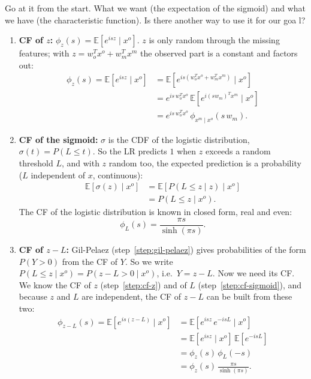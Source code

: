 \documentclass[10pt]{article}
\newcommand{\E}{\mathbb{E}}
\newcommand{\xo}{x^o}
\newcommand{\xm}{x^m}
\begin{document}
Go at it from the start. What we want (the expectation of the sigmoid) and what we have (the characteristic function). Is there another way to use it for our goa l?

\begin{enumerate}[label=\textbf{\arabic*.}, ref=\arabic*, itemsep=6pt]

\item \label{step:cf-z} \textbf{CF of $z$:} $\phi_z(s) = \E[e^{isz} \mid \xo]$. $z$ is only random through the missing features; with $z = w_o^T \xo + w_m^T \xm$ the observed part is a constant and factors out:
\begin{align*}
  \phi_z(s) = \E[e^{isz} \mid \xo] &= \E[e^{is(w_o^T \xo + w_m^T \xm)} \mid \xo] \\
  &= e^{is\, w_o^T \xo}\, \E[e^{i (s w_m)^T \xm} \mid \xo] \\
  &= e^{is\, w_o^T \xo}\, \phi_{\xm \mid \xo}(s\, w_m).
\end{align*}

\item \label{step:cf-sigmoid} \textbf{CF of the sigmoid:} $\sigma$ is the CDF of the logistic distribution, $\sigma(t) = P(L \leq t)$. So the LR predicts $1$ when $z$ exceeds a random threshold $L$, and with $z$ random too, the expected prediction is a probability ($L$ independent of $x$, continuous):
\begin{align*}
  \E[\sigma(z) \mid \xo] &= \E[P(L \leq z \mid z) \mid \xo] \\
  &= P(L \leq z \mid \xo).
\end{align*}
The CF of the logistic distribution is known in closed form, real and even:
\[
  \phi_L(s) = \frac{\pi s}{\sinh(\pi s)}.
\]

\item \label{step:cf-difference} \textbf{CF of $z - L$:} Gil-Pelaez (step~\ref{step:gil-pelaez}) gives probabilities of the form $P(Y > 0)$ from the CF of $Y$. So we write $P(L \leq z \mid \xo) = P(z - L > 0 \mid \xo)$, i.e.\ $Y = z - L$. Now we need its CF. We know the CF of $z$ (step~\ref{step:cf-z}) and of $L$ (step~\ref{step:cf-sigmoid}), and because $z$ and $L$ are independent, the CF of $z - L$ can be built from these two:
\begin{align*}
  \phi_{z-L}(s) = \E[e^{is(z - L)} \mid \xo] &= \E[e^{isz}\, e^{-isL} \mid \xo] \\
  &= \E[e^{isz} \mid \xo]\, \E[e^{-isL}] \\
  &= \phi_z(s)\, \phi_L(-s) \\
  &= \phi_z(s)\, \frac{\pi s}{\sinh(\pi s)}.
\end{align*}


\end{enumerate}
\end{document}
